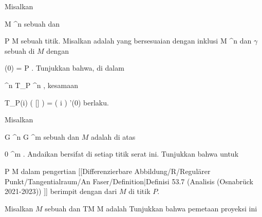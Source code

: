 {}
{

Misalkan

\mavergleichskette
{\vergleichskette
{ M
}
{ \subseteq }{ \R^n
}
{  }{
}
{    }{
}
{   }{
}
}
{}{}{}
sebuah
dan

\mavergleichskette
{\vergleichskette
{ P
}
{ \in }{ M
}
{  }{
}
{    }{
}
{   }{
}
}
{}{}{}
sebuah titik. Misalkan
 adalah
yang bersesuaian dengan inklusi
 { M } {\R^n
} {}
dan $\gamma$ sebuah
di $M$ dengan

\mavergleichskettedisp
{\vergleichskette
{ \gamma(0)
}
{ =} { P
}
{ } {
}
{ } {
}
{ } {
}
}
{}{}{.}
Tunjukkan bahwa, di dalam

\mavergleichskette
{\vergleichskette
{ \R^n
}
{ \cong }{ T_P \R^n
}
{  }{
}
{    }{
}
{   }{
}
}
{}{}{}, kesamaan

\mavergleichskettedisp
{\vergleichskette
{ T_P(i) ( [\gamma] )
}
{ =} { \left(  i \circ \gamma  \right) '(0)
}
{ } {
}
{ } {
}
{ } {
}
}
{}{}{}
berlaku.

}
{} {}

{}
{

Misalkan

\mavergleichskette
{\vergleichskette
{ G
}
{ \subseteq }{ \R^n
}
{  }{
}
{    }{
}
{   }{
}
}
{}{}{}
\maabb {\varphi} { G } {\R^m
} {}
sebuah
dan $M$ adalah
di atas

\mavergleichskette
{\vergleichskette
{ 0
}
{ \in }{ \R^m
}
{  }{
}
{    }{
}
{   }{
}
}
{}{}{.}
Andaikan
bersifat
di setiap titik serat ini. Tunjukkan bahwa untuk

\mavergleichskette
{\vergleichskette
{ P
}
{ \in }{ M
}
{  }{
}
{    }{
}
{   }{
}
}
{}{}{}
dalam pengertian
[[Differenzierbare Abbildung/R/Regulärer Punkt/Tangentialraum/An Faser/Definition|Definisi 53.7 (Analisis (Osnabrück 2021-2023))  ]] berimpit dengan
dari
$M$ di titik $P$.

}
{} {}

{}
{

Misalkan $M$ sebuah
dan
\maabbdisp {\pi} {TM} {M
} {}
adalah
Tunjukkan bahwa pemetaan proyeksi ini

}
{} {}

